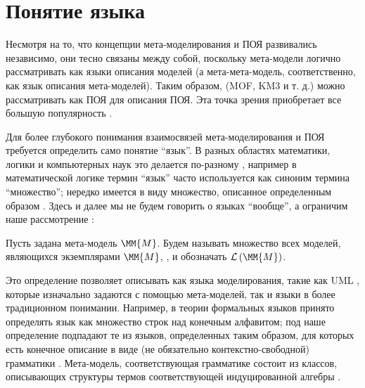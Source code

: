\chapter{Понятие языка}

Несмотря на то, что концепции мета-моделирования и ПОЯ развивались независимо, они тесно связаны между собой, поскольку мета-модели логично рассматривать как языки описания моделей (а мета-мета-модель, соответственно, как язык описания мета-моделей). Таким образом,  (MOF, KM3 и т. д.) можно рассматривать как ПОЯ для описания ПОЯ. Эта точка зрения приобретает все большую популярность \cite{}.

Для более глубокого понимания взаимосвязей мета-моделирования и ПОЯ требуется определить само понятие ``язык''. В разных областях математики, логики и компьютерных наук это делается по-разному \cite{???}, например в математической логике термин ``язык'' часто используется как синоним термина ``множество''; нередко имеется в виду множество, описанное определенным образом \cite{}. Здесь и далее мы не будем говорить о языках ``вообще'', а ограничим наше рассмотрение :

\newcommand{\Lang}[1]{\mathcal{L}\left(#1\right)}%
\newcommand{\LMM}[1]{\Lang{\MM{#1}}}%

\begin{Def}
Пусть задана мета-модель $\MM{M}$. Будем называть множество всех моделей, являющихся экземплярами $\MM{M}$, , и обозначать $\Lang{\MM{M}}$.
\end{Def}

Это определение позволяет описывать как языка моделирования, такие как UML \cite{UML}, которые изначально задаются с помощью мета-моделей, так и языки в более традиционном понимании. Например, в теории формальных языков \cite{???} принято определять язык как множество строк над конечным алфавитом; под наше определение подпадают те из языков, определенных таким образом, для которых есть конечное описание в виде (не обязательно контекстно-свободной) грамматики \cite{???}. Мета-модель, соответствующая грамматике состоит из классов, описывающих структуры термов соответствующей индуцированной алгебры \cite{???}.

